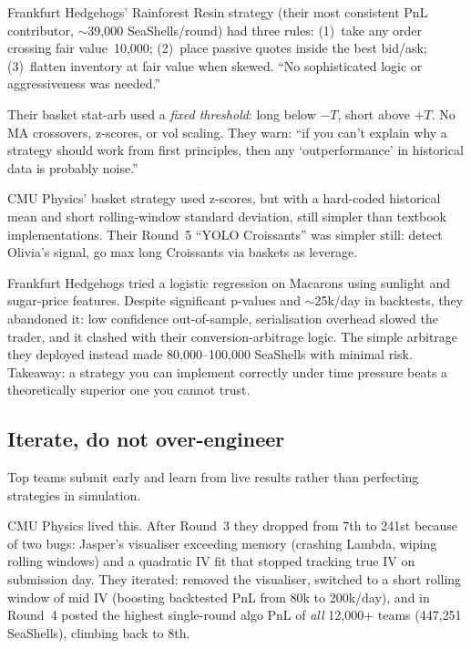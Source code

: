 Frankfurt Hedgehogs' Rainforest Resin strategy (their most
consistent PnL contributor, $\sim$39{,}000 SeaShells/round) had
three rules: (1)~take any order crossing fair value~10{,}000;
(2)~place passive quotes inside the best bid/ask;
(3)~flatten inventory at fair value when skewed.  ``No
sophisticated logic or aggressiveness was needed.''

Their basket stat-arb used a \emph{fixed threshold}: long below
$-T$, short above $+T$.  No MA crossovers, z-scores, or vol
scaling.  They warn: ``if you can't explain why a strategy should
work from first principles, then any `outperformance' in
historical data is probably noise.''

CMU Physics' basket strategy used z-scores, but with a hard-coded
historical mean and short rolling-window standard deviation, still
simpler than textbook implementations.  Their Round~5 ``YOLO
Croissants'' was simpler still: detect Olivia's signal, go max
long Croissants via baskets as leverage.

\begin{pitfallbox}
Frankfurt Hedgehogs tried a logistic regression on Macarons using
sunlight and sugar-price features.  Despite significant p-values
and $\sim$25k/day in backtests, they abandoned it: low confidence
out-of-sample, serialisation overhead slowed the trader, and it
clashed with their conversion-arbitrage logic.  The simple
arbitrage they deployed instead made 80{,}000--100{,}000 SeaShells
with minimal risk.  Takeaway: a strategy you can implement
correctly under time pressure beats a theoretically superior one
you cannot trust.
\end{pitfallbox}

\subsection{Iterate, do not over-engineer}
\label{sec:iterate}

Top teams submit early and learn from live results rather than
perfecting strategies in simulation.

CMU Physics lived this.  After Round~3 they dropped from 7th to
241st because of two bugs: Jasper's visualiser exceeding memory (crashing
Lambda, wiping rolling windows) and a quadratic IV fit that
stopped tracking true IV on submission day.  They iterated:
removed the visualiser, switched to a short rolling window of
mid IV (boosting backtested PnL from 80k to 200k/day), and in
Round~4 posted the highest single-round algo PnL of \emph{all}
12{,}000+ teams (447{,}251 SeaShells), climbing back to 8th.

